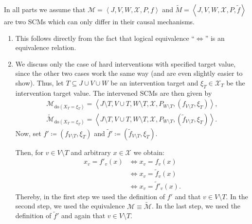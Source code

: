   \begin{gradedsolution}
    In all parts we assume that $\mathcal{M} = \left\langle J, V, W, \mathcal{X}, P, f \right\rangle$ and $\widetilde{M} = \left\langle J, V, W, \mathcal{X}, P, \widetilde{f} \right\rangle$ are two SCMs which can only differ in their causal mechanisms.
    \begin{enumerate}
    \item This follows directly from the fact that logical equivalence ``$\Longleftrightarrow$'' is an equivalence relation. 
    \item We discuss only the case of hard interventions with specified target value, since the other two cases work the same way (and are even slightly easier to show).
      Thus, let $T \subseteq J \cup V \cup W$ be an intervention target and $\xi_{T} \in \mathcal{X}_T$ be the intervention target value. 
      The intervened SCMs are then given by 
      \begin{align*}
	\mathcal{M}_{\text{do}(X_T = \xi_T)} = \left\langle J \setminus T, V \cup T, W \setminus T, \mathcal{X}, P_{W \setminus T}, (f_{V \setminus T}, \xi_T) \right\rangle, \\
	\widetilde{\mathcal{M}}_{\text{do}(X_T = \xi_T)} = \left\langle J \setminus T, V \cup T, W \setminus T, \mathcal{X}, P_{W \setminus T}, (\widetilde{f}_{V \setminus T}, \xi_T) \right\rangle.
      \end{align*}
      Now, set $f' \coloneq (f_{V \setminus T}, \xi_T)$ and $\widetilde{f}' \coloneq (\widetilde{f}_{V \setminus T}, \xi_T)$. 

      Then, for $v \in V \setminus T$ and arbitrary $x \in \mathcal{X}$ we obtain:
      \begin{align*}
	x_v = f'_v(x) & \Longleftrightarrow x_v = f_v(x) \\
	& \Longleftrightarrow x_v = \widetilde{f}_v(x) \\
	& \Longleftrightarrow x_v = \widetilde{f}'_v(x).
      \end{align*}
      Thereby, in the first step we used the definition of $f'$ and that $v \in V \setminus T$. 
      In the second step, we used the equivalence $\mathcal{M} \equiv \widetilde{\mathcal{M}}$.
      In the last step, we used the definition of $\widetilde{f}'$ and again that $v \in V \setminus T$.


\end{enumerate}
\end{gradedsolution}
